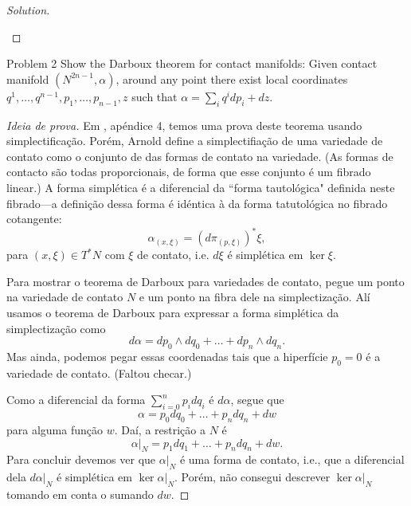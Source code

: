 \begin{proof}[Solution]
\begin{enumerate}[label=(\alph*)]
\begin{enumerate}[label=(\arabic*)]
	\end{enumerate}
\end{enumerate}
\end{proof}

\begin{thing4}{Problem 2}\leavevmode
	Show the Darboux theorem for contact manifolds: Given contact manifold $(N^{2n-1},\alpha)$, around any point there exist local coordinates $q^1,\ldots,q^{n-1},p_1,\ldots,p_{n-1},z$ such that $\alpha=\sum_i q^i dp_i + dz$.
\end{thing4}

\begin{proof}[Ideia de prova]\leavevmode
Em \cite{arn}, apéndice 4, temos uma prova deste teorema usando simplectificação. Porém, Arnold define a simplectifiação de uma variedade de contato como o conjunto de das formas de contato na variedade. (As formas de contacto são todas proporcionais, de forma que esse conjunto é um fibrado linear.) A forma simplética é a diferencial da “forma tautológica" definida neste fibrado---a definição dessa forma é idéntica à da forma tatutológica no fibrado cotangente:
\[\alpha_{(x,\xi)}=(d\pi_{(p,\xi)})^*\xi,\]
para $(x,\xi)\in T^*N$ com  $\xi$ de contato, i.e. $d\xi$ é simplética em $\ker \xi$.

Para mostrar o teorema de Darboux para variedades de contato, pegue um ponto na variedade de contato $N$ e um ponto na fibra dele na simplectização. Alí usamos o teorema de Darboux para expressar a forma simplética da simplectização como
\[d\alpha=dp_0\wedge dq_0+\ldots+dp_n\wedge dq_n.\]
Mas ainda, podemos pegar essas coordenadas tais que a hiperfície $p_0=0$ é a variedade de contato. {\color{3}(Faltou checar.)}

Como a diferencial da forma $\sum_{i=0}^n p_idq_i$ é $d\alpha$, segue que
\[\alpha=p_0dq_0+\ldots+p_ndq_n+dw\]
para alguma função $w$. Daí, a restrição a $N$ é
\[\alpha|_{N}=p_1dq_1+\ldots+p_ndq_n+dw.\]
Para concluir devemos ver que $\alpha|_{N}$ é uma forma de contato, i.e., que a diferencial dela  $d\alpha|_{N}$ é simplética em $\ker \alpha|_{N}$. Porém, {\color{3}não consegui descrever $\ker \alpha|_{N}$ tomando em conta o sumando $dw$.}




\end{proof}



